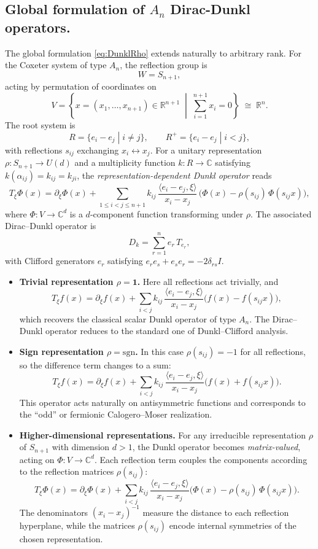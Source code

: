 \documentclass[12pt]{article}
\newcommand{\1}{\mathbbm{1}}
\theoremstyle{definition}
\begin{document}
\subsection{Global formulation of $A_n$ Dirac-Dunkl operators.}
The global formulation \eqref{eq:DunklRho} extends naturally to arbitrary rank.
For the Coxeter system of type $A_n$, the reflection group is
\[
  W = S_{n+1},
\]
acting by permutation of coordinates on
\[
  V = \left\{ x = (x_1,\dots,x_{n+1}) \in \mathbb{R}^{n+1} \;\middle|\; 
  \sum_{i=1}^{n+1} x_i = 0 \right\} \;\cong\; \mathbb{R}^n.
\]
The root system is
\[
  R = \{ e_i - e_j \;|\; i \ne j \}, \qquad
  R^+ = \{ e_i - e_j \;|\; i < j \},
\]
with reflections $s_{ij}$ exchanging $x_i \leftrightarrow x_j$.
For a unitary representation $\rho: S_{n+1} \to U(d)$ and a multiplicity function
$k: R \to \mathbb{C}$ satisfying $k(\alpha_{ij})=k_{ij}=k_{ji}$, the
\emph{representation-dependent Dunkl operator} reads
\[
  T_\xi \Phi(x)
  = \partial_\xi \Phi(x)
  + \sum_{1\le i<j\le n+1} 
    k_{ij}\,\frac{\langle e_i - e_j, \xi\rangle}{x_i - x_j}\,
    \big(\Phi(x) - \rho(s_{ij})\,\Phi(s_{ij}x)\big),
\]
where $\Phi:V\to\mathbb{C}^d$ is a $d$-component function transforming under $\rho$.
The associated Dirac--Dunkl operator is
\[
  D_k = \sum_{r=1}^n e_r\,T_{e_r},
\]
with Clifford generators $e_r$ satisfying $e_r e_s + e_s e_r = -2\delta_{rs}I$.


\begin{itemize}
\item[(i)] \textbf{Trivial representation $\rho=\mathbf{1}$.}
Here all reflections act trivially, and
\[
  T_\xi f(x)
  = \partial_\xi f(x)
  + \sum_{i<j} k_{ij}\,\frac{\langle e_i - e_j, \xi\rangle}{x_i - x_j}
  \big(f(x) - f(s_{ij}x)\big),
\]
which recovers the classical scalar Dunkl operator of type $A_n$.
The Dirac--Dunkl operator reduces to the standard one of
Dunkl--Clifford analysis.

\item[(ii)] \textbf{Sign representation $\rho=\mathrm{sgn}$.}
In this case $\rho(s_{ij})=-1$ for all reflections,
so the difference term changes to a sum:
\[
  T_\xi f(x)
  = \partial_\xi f(x)
  + \sum_{i<j} k_{ij}\,\frac{\langle e_i - e_j, \xi\rangle}{x_i - x_j}
  \big(f(x) + f(s_{ij}x)\big).
\]
This operator acts naturally on antisymmetric functions and corresponds
to the “odd” or fermionic Calogero--Moser realization.

\item[(iii)] \textbf{Higher-dimensional representations.}
For any irreducible representation $\rho$ of $S_{n+1}$ with dimension $d>1$,
the Dunkl operator becomes \emph{matrix-valued}, acting on
$\Phi:V\to\mathbb{C}^d$.  Each reflection term couples the components according
to the reflection matrices $\rho(s_{ij})$:
\[
  T_\xi \Phi(x)
  = \partial_\xi \Phi(x)
  + \sum_{i<j} k_{ij}\,\frac{\langle e_i - e_j, \xi\rangle}{x_i - x_j}
    \big(\Phi(x) - \rho(s_{ij})\,\Phi(s_{ij}x)\big).
\]
The denominators $(x_i - x_j)^{-1}$ measure the distance to each reflection
hyperplane, while the matrices $\rho(s_{ij})$ encode internal symmetries of
the chosen representation.
\end{itemize}
\end{document}

